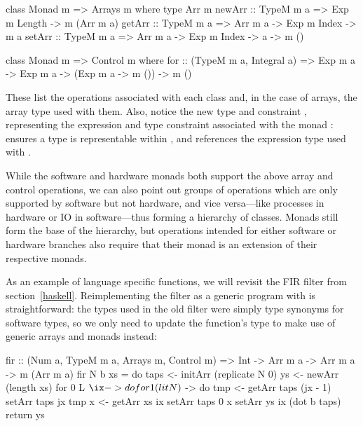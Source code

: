\documentclass[../main.tex]{subfiles}
\begin{document}

\begin{code}
class Monad m => Arrays m where
  type Arr m
  newArr :: TypeM m a => Exp m Length -> m (Arr m a)
  getArr :: TypeM m a => Arr m a -> Exp m Index -> m a
  setArr :: TypeM m a => Arr m a -> Exp m Index -> a -> m ()

class Monad m => Control m where
  for :: (TypeM m a, Integral a) => Exp m a -> Exp m a -> (Exp m a -> m ())
      -> m ()
\end{code}

\noindent These list the operations associated with each class and, in the case of arrays, the array type used with them. Also, notice the new type  and constraint , representing the expression and type constraint associated with the monad :  ensures a type is representable within , and  references the expression type used with .


While the software and hardware monads both support the above array and control operations, we can also point out groups of operations which are only supported by software but not hardware, and vice versa---like processes in hardware or IO in software---thus forming a hierarchy of classes. Monads still form the base of the hierarchy, but operations intended for either software or hardware branches also require that their monad is an extension of their respective monads.

As an example of language specific functions, we will revisit the FIR filter from section~\ref{haskell}. Reimplementing the filter as a generic program with is straightforward: the types used in the old filter were simply type synonyms for software types, so we only need to update the function's type to make use of generic arrays and monads instead:

\begin{code}
fir :: (Num a, TypeM m a, Arrays m, Control m) => Int -> Arr m a -> Arr m a
    -> m (Arr m a)
fir N b xs = do
  taps <- initArr (replicate N 0)
  ys   <- newArr  (length xs)
  for 0 L $ \ix -> do
    for 1 (lit N) $ \jx -> do
      tmp <- getArr taps (jx - 1)
      setArr taps jx tmp
    x <- getArr xs ix
    setArr taps 0 x
    setArr ys ix (dot b taps)
  return ys
\end{code}
\end{document}
